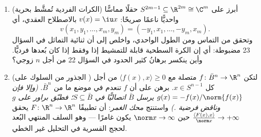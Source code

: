 \begin{problem}
\begin{enumerate}[resume]
  \item (الكرات الفردية تُمشَّط بحرية) أبرز على $S^{2m-1}
        \subseteq \R^{2m} \cong \C^m$ حقلًا
        مماسًّا واحديًّا ناعمًا صريحًا: $v(x) = \iu x$
        بالاصطلاح العقدي، أي
        \[
        v(x_1, y_1, \dots, x_m, y_m) =
        (-y_1, x_1, \dots, -y_m, x_m) .
        \]
        وتحقق من التماس ومن الطول الواحدي، واخلص إلى أن ثنائية
        التماثل في السؤال 23 مضبوطة: أي إن الكرة السطحية قابلة
        للتمشيط إذا وفقط إذا كان بُعدها فرديًّا. وأين ينكسر
        برهانُ كثير الحدود في السؤال 22 من أجل $n$ زوجي؟
  \item (الجذور من السلوك على ) لتكن $f \colon \bar
        B^n \to \R^n$ متصلة مع
        $\langle f(x),
        x\rangle \geq 0$ من أجل كل $x \in S^{n-1}$. برهن على أن $f$
        تنعدم في موضع ما من $\bar B^n$. \emph{(وإلا فإن $g(x) = -f(x)/\norm{f(x)}$
        يرسل $\bar B$ اتصاليًّا في $S \subseteq \bar B$؛ فطبّق براور على $g$
        وناقض فرضية .)} واستنتج \emph{محك الغمر}: أن
        تطبيقًا  $F\colon\R^n\to\R^n$ يحقق $\frac{\langle F(x), x\rangle}{\norm x} \to
        +\infty$ حين $\norm x \to \infty$ يكون
        غامرًا --- وهو السلف المنتهي البُعد لحجج القسرية في
        التحليل غير الخطي.
\end{enumerate}
\end{problem}
